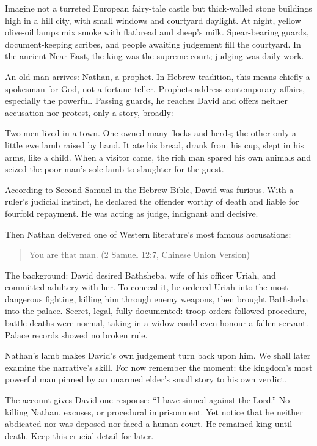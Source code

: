 Imagine not a turreted European fairy-tale castle but thick-walled stone buildings high in a hill city, with small windows and courtyard daylight. At night, yellow olive-oil lamps mix smoke with flatbread and sheep's milk. Spear-bearing guards, document-keeping scribes, and people awaiting judgement fill the courtyard. In the ancient Near East, the king was the supreme court; judging was daily work.

An old man arrives: Nathan, a prophet. In Hebrew tradition, this means chiefly a spokesman for God, not a fortune-teller. Prophets address contemporary affairs, especially the powerful. Passing guards, he reaches David and offers neither accusation nor protest, only a story, broadly:

Two men lived in a town. One owned many flocks and herds; the other only a little ewe lamb raised by hand. It ate his bread, drank from his cup, slept in his arms, like a child. When a visitor came, the rich man spared his own animals and seized the poor man's sole lamb to slaughter for the guest.

According to Second Samuel in the Hebrew Bible, David was furious. With a ruler's judicial instinct, he declared the offender worthy of death and liable for fourfold repayment. He was acting as judge, indignant and decisive.

Then Nathan delivered one of Western literature's most famous accusations:

\begin{quote}
You are that man. (2 Samuel 12:7, Chinese Union Version)
\end{quote}
The background: David desired Bathsheba, wife of his officer Uriah, and committed adultery with her. To conceal it, he ordered Uriah into the most dangerous fighting, killing him through enemy weapons, then brought Bathsheba into the palace. Secret, legal, fully documented: troop orders followed procedure, battle deaths were normal, taking in a widow could even honour a fallen servant. Palace records showed no broken rule.

Nathan's lamb makes David's own judgement turn back upon him. We shall later examine the narrative's skill. For now remember the moment: the kingdom's most powerful man pinned by an unarmed elder's small story to his own verdict.

The account gives David one response: ``I have sinned against the Lord.'' No killing Nathan, excuses, or procedural imprisonment. Yet notice that he neither abdicated nor was deposed nor faced a human court. He remained king until death. Keep this crucial detail for later.

